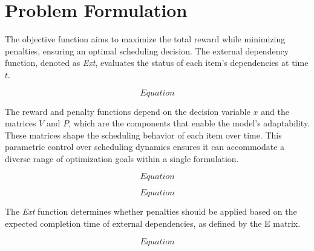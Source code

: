 \documentclass[12pt]{article}
\begin{document}

\section*{Problem Formulation}

The objective function aims to maximize the total reward while minimizing penalties, ensuring an optimal scheduling decision. The external dependency function, denoted as \textit{Ext}, evaluates the status of each item's dependencies at time \( t \).

\begin{equation}
    Equation
\end{equation}



The reward and penalty functions depend on the decision variable \( x \) and the matrices \( V \) and \( P \), which are the components that enable the model’s adaptability. These matrices shape the scheduling behavior of each item over time. This parametric control over scheduling dynamics ensures it can accommodate a diverse range of optimization goals within a single formulation.

\begin{equation}
    Equation
\end{equation}

\begin{equation}
    Equation
\end{equation}

The \textit{Ext} function determines whether penalties should be applied based on the expected completion time of external dependencies, as defined by the E matrix.

\begin{equation}
    Equation
\end{equation}
\end{document}
